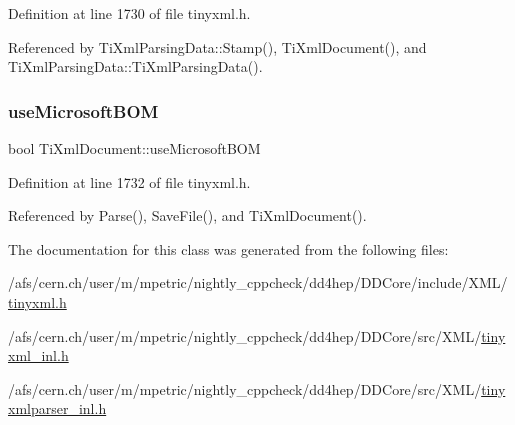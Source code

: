 Definition at line 1730 of file tinyxml.\+h.



Referenced by Ti\+Xml\+Parsing\+Data\+::\+Stamp(), Ti\+Xml\+Document(), and Ti\+Xml\+Parsing\+Data\+::\+Ti\+Xml\+Parsing\+Data().

\hypertarget{class_ti_xml_document_a4d5400dec9bfb55c640428de33297886}{}\label{class_ti_xml_document_a4d5400dec9bfb55c640428de33297886} 
\subsubsection{\texorpdfstring{use\+Microsoft\+B\+OM}{useMicrosoftBOM}}
{\footnotesize\ttfamily bool Ti\+Xml\+Document\+::use\+Microsoft\+B\+OM\hspace{0.3cm}{\ttfamily [private]}}



Definition at line 1732 of file tinyxml.\+h.



Referenced by Parse(), Save\+File(), and Ti\+Xml\+Document().



The documentation for this class was generated from the following files\+:\begin{DoxyCompactItemize}
\item 
/afs/cern.\+ch/user/m/mpetric/nightly\+\_\+cppcheck/dd4hep/\+D\+D\+Core/include/\+X\+M\+L/\hyperlink{tinyxml_8h}{tinyxml.\+h}\item 
/afs/cern.\+ch/user/m/mpetric/nightly\+\_\+cppcheck/dd4hep/\+D\+D\+Core/src/\+X\+M\+L/\hyperlink{tinyxml__inl_8h}{tinyxml\+\_\+inl.\+h}\item 
/afs/cern.\+ch/user/m/mpetric/nightly\+\_\+cppcheck/dd4hep/\+D\+D\+Core/src/\+X\+M\+L/\hyperlink{tinyxmlparser__inl_8h}{tinyxmlparser\+\_\+inl.\+h}\end{DoxyCompactItemize}
